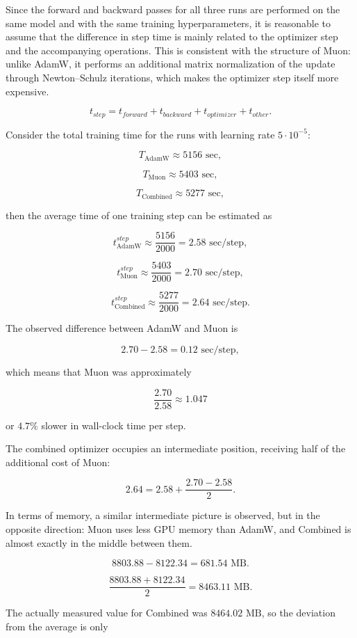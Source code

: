 \documentclass{article}
\begin{document}
Since the forward and backward passes for all three runs are performed on the same model and with the same training hyperparameters, it is reasonable to assume that the difference in step time is mainly related to the optimizer step and the accompanying operations. This is consistent with the structure of Muon: unlike AdamW, it performs an additional matrix normalization of the update through Newton--Schulz iterations, which makes the optimizer step itself more expensive.

$$
t_{step} =
t_{forward} +
t_{backward} +
t_{optimizer} +
t_{other}.
$$

Consider the total training time for the runs with learning rate $5 \cdot 10^{-5}$:

$$
T_{\text{AdamW}} \approx 5156 \text{ sec},
$$

$$
T_{\text{Muon}} \approx 5403 \text{ sec},
$$

$$
T_{\text{Combined}} \approx 5277 \text{ sec},
$$

then the average time of one training step can be estimated as

$$
t^{step}_{\text{AdamW}} \approx \frac{5156}{2000} = 2.58 \text{ sec/step},
$$

$$
t^{step}_{\text{Muon}} \approx \frac{5403}{2000} = 2.70 \text{ sec/step},
$$

$$
t^{step}_{\text{Combined}} \approx \frac{5277}{2000} = 2.64 \text{ sec/step}.
$$

The observed difference between AdamW and Muon is

$$
2.70 - 2.58 = 0.12 \text{ sec/step},
$$

which means that Muon was approximately

$$
\frac{2.70}{2.58} \approx 1.047
$$

or $4.7\%$ slower in wall-clock time per step.

The combined optimizer occupies an intermediate position, receiving half of the additional cost of Muon:

$$
2.64 = 2.58 + \frac{2.70 - 2.58}{2}.
$$

In terms of memory, a similar intermediate picture is observed, but in the opposite direction: Muon uses less GPU memory than AdamW, and Combined is almost exactly in the middle between them.

$$
8803.88 - 8122.34 = 681.54 \text{ MB}.
$$

$$
\frac{8803.88 + 8122.34}{2} = 8463.11 \text{ MB}.
$$

The actually measured value for Combined was $8464.02 \text{ MB}$, so the deviation from the average is only
\end{document}
